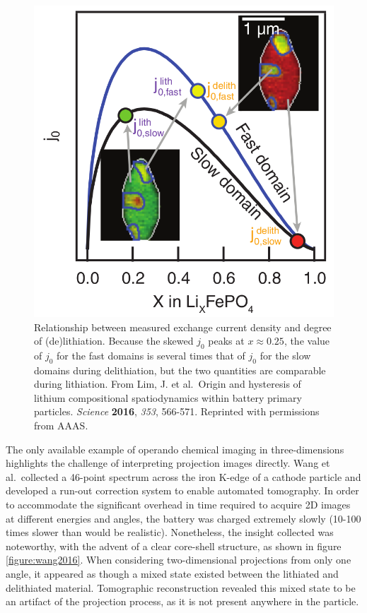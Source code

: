 \documentclass[journal=cmatex,manuscript=perspective]{achemso}
\begin{document}
\begin{figure}
  \includegraphics[width=\textwidth]{lim2016.png}
  \caption{Relationship between measured exchange current density and
    degree of (de)lithiation. Because the skewed $j_0$ peaks at $x
    \approx 0.25$, the value of $j_0$ for the fast domains is several
    times that of $j_0$ for the slow domains during delithiation, but
    the two quantities are comparable during lithiation. From Lim,
    J. et al.\ Origin and hysteresis of lithium compositional
    spatiodynamics within battery primary particles. \textit{Science}
    \textbf{2016}, \textit{353}, 566-571. Reprinted with permissions
    from AAAS.}
  \label{figure:lim2016}
\end{figure}

The only available example of operando chemical imaging in
three-dimensions highlights the challenge of interpreting projection
images directly. Wang et al.\ collected a 46-point spectrum across the
iron K-edge of a  cathode particle and developed a run-out
correction system to enable automated tomography. In order to
accommodate the significant overhead in time required to acquire 2D
images at different energies and angles, the battery was charged
extremely slowly (10-100 times slower than would be
realistic). Nonetheless, the insight collected was noteworthy, with
the advent of a clear core-shell structure, as shown in figure
\ref{figure:wang2016}. When considering two-dimensional projections
from only one angle, it appeared as though a mixed state existed
between the lithiated and delithiated material. Tomographic
reconstruction revealed this mixed state to be an artifact of the
projection process, as it is not present anywhere in the particle\cite{wang2016}.
\end{document}
